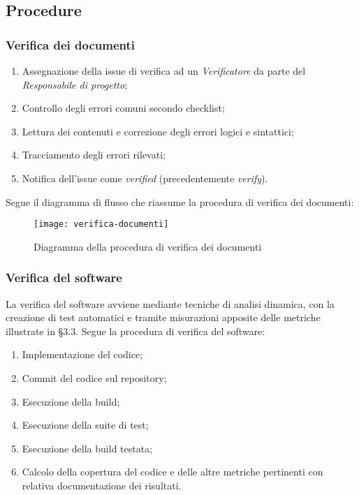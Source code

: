 \documentclass[../NormediProgetto.tex]{subfiles}
\begin{document}
\subsection{Procedure}

\subsubsection{Verifica dei documenti}

\begin{enumerate}
	\item Assegnazione della issue di verifica ad un \textit{Verificatore} da parte del \textit{Responsabile di progetto};
	
	\item Controllo degli errori comuni secondo checklist;
	
	\item Lettura dei contenuti e correzione degli errori logici e sintattici;
	
	\item Tracciamento degli errori rilevati;
	
	\item Notifica dell'issue come \textit{verified} (precedentemente \textit{verify}).
\end{enumerate}

Segue il diagramma di flusso che riassume la procedura di verifica dei documenti:

\begin{figure}[H]
	\texttt{[image: verifica-documenti]}
	\centering
	\caption{Diagramma della procedura di verifica dei documenti}
\end{figure}

\newpage

\subsubsection{Verifica del software}

La verifica del software avviene mediante tecniche di analisi dinamica, con la creazione di test automatici e tramite misurazioni apposite delle metriche illustrate in §3.3. Segue la procedura di verifica del software:

\begin{enumerate}
	\item Implementazione del codice;
	
	\item Commit del codice sul repository;
	
	\item Esecuzione della build;
	
	\item Esecuzione della suite di test;
	
	\item Esecuzione della build testata;
	
	\item Calcolo della copertura del codice e delle altre metriche pertinenti con relativa documentazione dei risultati.
\end{enumerate}
\end{document}
